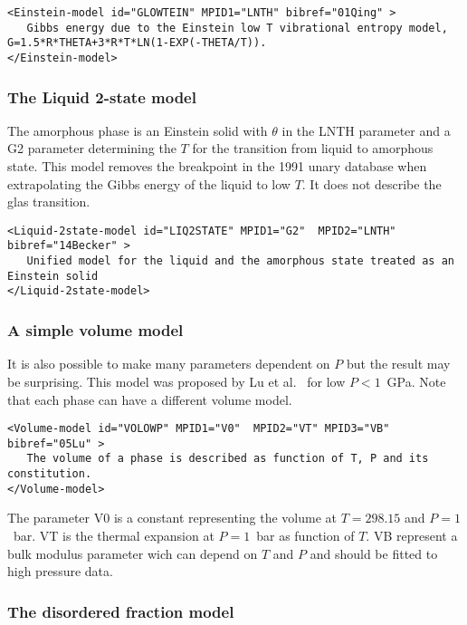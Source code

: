 \documentclass[12pt]{article}
\begin{document}
\begin{appendices}
{\small
\begin{verbatim}
<Einstein-model id="GLOWTEIN" MPID1="LNTH" bibref="01Qing" > 
   Gibbs energy due to the Einstein low T vibrational entropy model, G=1.5*R*THETA+3*R*T*LN(1-EXP(-THETA/T)).
</Einstein-model>
\end{verbatim}
}

\subsubsection{The Liquid 2-state model}

The amorphous phase is an Einstein solid with $\theta$ in the LNTH
parameter and a G2 parameter determining the $T$ for the transition
from liquid to amorphous state.  This model removes the breakpoint in
the 1991 unary database when extrapolating the Gibbs energy of the
liquid to low $T$.  It does not describe the glas transition.

{\small
\begin{verbatim}
<Liquid-2state-model id="LIQ2STATE" MPID1="G2"  MPID2="LNTH" bibref="14Becker" >
   Unified model for the liquid and the amorphous state treated as an Einstein solid
</Liquid-2state-model>
\end{verbatim}
}

\subsubsection{A simple volume model}

It is also possible to make many parameters dependent on $P$ but the
result may be surprising.  This model was proposed by Lu et
al.~\cite{05Lu} for low $P<1$~GPa.  Note that each phase can have a
different volume model.
{\small
\begin{verbatim}
<Volume-model id="VOLOWP" MPID1="V0"  MPID2="VT" MPID3="VB" bibref="05Lu" >
   The volume of a phase is described as function of T, P and its constitution.
</Volume-model>
\end{verbatim}
}

The parameter V0 is a constant representing the volume at $T=298.15$
and $P=1$~bar.  VT is the thermal expansion at $P=1$~bar as function
of $T$.  VB represent a bulk modulus parameter wich can depend on $T$
and $P$ and should be fitted to high pressure data.

\subsubsection{The disordered fraction model}\label{sc:disfs}


\end{appendices}
\end{document}
